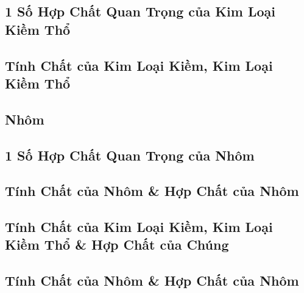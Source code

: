 \documentclass{article}
\numberwithin{equation}{section}
\begin{document}
\subsection{1 Số Hợp Chất Quan Trọng của Kim Loại Kiềm Thổ}


\subsection{Tính Chất của Kim Loại Kiềm, Kim Loại Kiềm Thổ}


\subsection{Nhôm}


\subsection{1 Số Hợp Chất Quan Trọng của Nhôm}


\subsection{Tính Chất của Nhôm \& Hợp Chất của Nhôm}


\subsection{Tính Chất của Kim Loại Kiềm, Kim Loại Kiềm Thổ \& Hợp Chất của Chúng}


\subsection{Tính Chất của Nhôm \& Hợp Chất của Nhôm}

\end{document}
